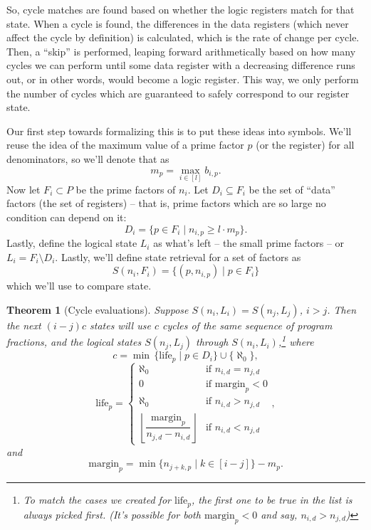 \documentclass[12pt]{article}
\newtheorem{theorem}{Theorem}
\begin{document}
So, cycle matches are found based on whether the logic registers match for that state. When a cycle is found, the differences in the data registers (which never affect the cycle by definition) is calculated, which is the rate of change per cycle. Then, a ``skip'' is performed, leaping forward arithmetically based on how many cycles we can perform until some data register with a decreasing difference runs out, or in other words, would become a logic register. This way, we only perform the number of cycles which are guaranteed to safely correspond to our register state.

Our first step towards formalizing this is to put these ideas into symbols. We'll reuse the idea of the maximum value of a prime factor $p$ (or the register) for all denominators, so we'll denote that as
\[
m_p = \max_{i \in [l]} b_{i,p}.
\]
Now let $F_i \subset P$ be the prime factors of $n_i$. Let $D_i \subseteq F_i$ be the set of ``data'' factors (the set of registers) -- that is, prime factors which are so large no condition can depend on it:
\[
D_i = \{p \in F_i \mid n_{i,p} \geq l \cdot m_p\}.
\]
Lastly, define the logical state $L_i$ as what's left -- the small prime factors -- or $L_i = F_i \setminus D_i$. Lastly, we'll define state retrieval for a set of factors as
\[
S(n_i, F_i) = \{(p, n_{i,p}) \mid p \in F_i\}
\]
which we'll use to compare state.

\begin{theorem}[Cycle evaluations]\label{thm:cycle}
Suppose $S(n_i, L_i) = S(n_j, L_j)$, $i > j$. Then the next $(i-j)c$ states will use $c$ cycles of the same sequence of program fractions, and the logical states $S(n_j, L_j)$ through $S(n_i, L_i)$,\footnote{To match the cases we created for $\mathrm{life}_p$, the first one to be true in the list is always picked first. (It's possible for both $\mathrm{margin}_p < 0$ and say, $n_{i,d} > n_{j,d}$)} where
\[
c = \min\,\{\mathrm{life}_p \mid p \in D_i\} \cup \{\aleph_0\},
\]
\[
\mathrm{life}_p =
\begin{cases}
\aleph_0 & \text{if } n_{i,d} = n_{j,d} \\
0 & \text{if } \mathrm{margin}_p < 0 \\
\aleph_0 & \text{if } n_{i,d} > n_{j,d} \\
\left\lfloor \dfrac{\mathrm{margin}_p}{n_{j,d} - n_{i,d}} \right\rfloor & \text{if } n_{i,d} < n_{j,d}
\end{cases},
\]
and
\[
\mathrm{margin}_p = \min\{n_{j+k,p} \mid k \in [i-j]\} - m_p.
\]
\end{theorem}
\end{document}

